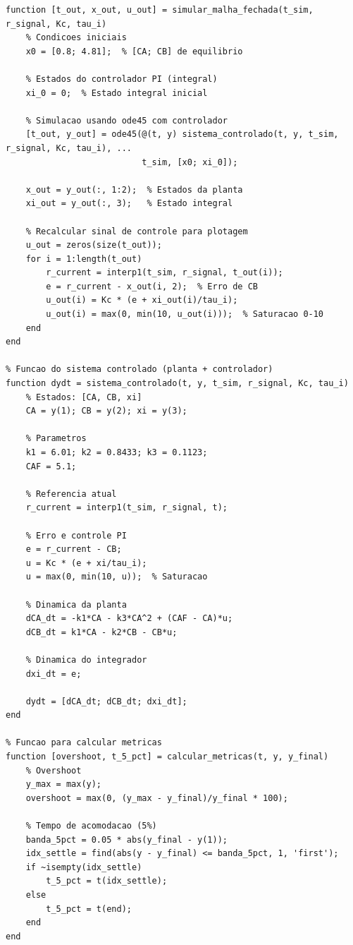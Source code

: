\documentclass[a4paper,12pt]{article}
\begin{document}
\begin{lstlisting}[caption=Simulacao do controle PI em sistema nao linear]
% Funcao de simulacao em malha fechada
function [t_out, x_out, u_out] = simular_malha_fechada(t_sim, r_signal, Kc, tau_i)
    % Condicoes iniciais
    x0 = [0.8; 4.81];  % [CA; CB] de equilibrio
    
    % Estados do controlador PI (integral)
    xi_0 = 0;  % Estado integral inicial
    
    % Simulacao usando ode45 com controlador
    [t_out, y_out] = ode45(@(t, y) sistema_controlado(t, y, t_sim, r_signal, Kc, tau_i), ...
                           t_sim, [x0; xi_0]);
    
    x_out = y_out(:, 1:2);  % Estados da planta
    xi_out = y_out(:, 3);   % Estado integral
    
    % Recalcular sinal de controle para plotagem
    u_out = zeros(size(t_out));
    for i = 1:length(t_out)
        r_current = interp1(t_sim, r_signal, t_out(i));
        e = r_current - x_out(i, 2);  % Erro de CB
        u_out(i) = Kc * (e + xi_out(i)/tau_i);
        u_out(i) = max(0, min(10, u_out(i)));  % Saturacao 0-10
    end
end

% Funcao do sistema controlado (planta + controlador)
function dydt = sistema_controlado(t, y, t_sim, r_signal, Kc, tau_i)
    % Estados: [CA, CB, xi]
    CA = y(1); CB = y(2); xi = y(3);
    
    % Parametros
    k1 = 6.01; k2 = 0.8433; k3 = 0.1123;
    CAF = 5.1;
    
    % Referencia atual
    r_current = interp1(t_sim, r_signal, t);
    
    % Erro e controle PI
    e = r_current - CB;
    u = Kc * (e + xi/tau_i);
    u = max(0, min(10, u));  % Saturacao
    
    % Dinamica da planta
    dCA_dt = -k1*CA - k3*CA^2 + (CAF - CA)*u;
    dCB_dt = k1*CA - k2*CB - CB*u;
    
    % Dinamica do integrador
    dxi_dt = e;
    
    dydt = [dCA_dt; dCB_dt; dxi_dt];
end

% Funcao para calcular metricas
function [overshoot, t_5_pct] = calcular_metricas(t, y, y_final)
    % Overshoot
    y_max = max(y);
    overshoot = max(0, (y_max - y_final)/y_final * 100);
    
    % Tempo de acomodacao (5%)
    banda_5pct = 0.05 * abs(y_final - y(1));
    idx_settle = find(abs(y - y_final) <= banda_5pct, 1, 'first');
    if ~isempty(idx_settle)
        t_5_pct = t(idx_settle);
    else
        t_5_pct = t(end);
    end
end
\end{lstlisting}
\end{document}
